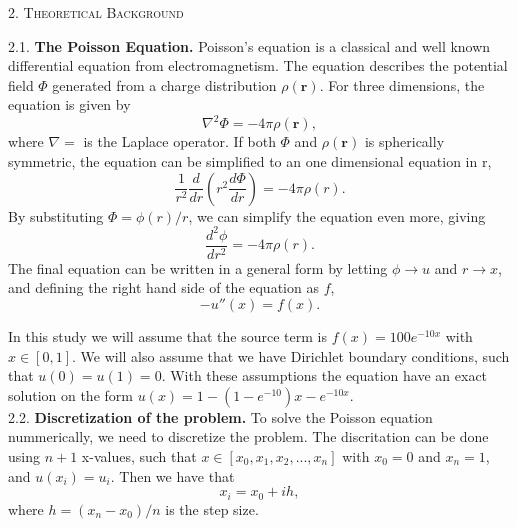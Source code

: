 \documentclass[a4paper,10pt]{article}
\newcommand{\der}[2]{\frac{d #1}{d #2}}
\newcommand{\dder}[2]{\frac{d^2 #1}{d #2 ^2}}
\begin{document}
\begin{center}
\textsc{2. Theoretical Background}
\end{center}
2.1. \textbf{The Poisson Equation.} 
Poisson's equation is a classical and well known differential equation from electromagnetism. The equation describes the potential field $\Phi$ generated from a charge distribution $\rho(\textbf{r})$. For three dimensions, the equation is given by
 $$ \nabla^2 \Phi = -4 \pi \rho(\textbf{r}), $$
where $\nabla = $ is the Laplace operator. If both $\Phi$ and $\rho(\textbf{r})$ is spherically symmetric, the equation can be simplified to an one dimensional equation in r,
$$ \frac{1}{r^2}  \der{}{r} \left( r^2 \der{\Phi}{r} \right)= -4 \pi \rho(r).$$
By substituting $\Phi = \phi(r)/r$, we can simplify the equation even more, giving 
$$ \dder{\phi}{r} = -4\pi \rho(r). $$ 
The final equation can be written in a general form by letting $\phi \rightarrow u$ and $r \rightarrow x$, and defining the right hand side of the equation as $f$,
$$- u''(x) = f(x). $$ 

In this study we will assume that the source term is $f(x) = 100 e^{-10x}$ with $x \in [0,1]$. We will also assume that we have Dirichlet boundary conditions, such that $ u(0) = u(1) = 0. $ With these assumptions the equation have an exact solution on the form $u(x) = 1 - (1 - e^{-10})x - e^{-10x}$. \\



2.2. \textbf{Discretization of the problem.} 
To solve the Poisson equation nummerically, we need to discretize the problem. The discritation can be done using $n+1$ x-values, such that $x \in [x_0, x_1, x_2, ..., x_n]$ with $x_0 = 0$ and $x_n = 1$, and $u(x_i) = u_i$. Then we have that 
$$ x_i = x_0 + ih, $$
where $h = (x_n - x_0)/n$ is the step size. \\
\end{document}
